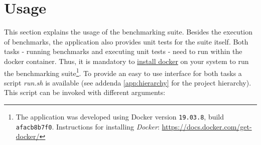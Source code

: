 \section{Usage}\label{sec:benchmarks_usage}
This section explains the usage of the benchmarking suite. Besides the execution of benchmarks, the application also provides unit tests for the suite itself. Both tasks - running benchmarks and executing unit tests - need to run within the docker container. Thus, it is mandatory to \href{https://docs.docker.com/get-docker/}{install docker} on your system to run the benchmarking suite\footnote{The application was developed using Docker version \texttt{19.03.8}, build \texttt{afacb8b7f0}. Instructions for installing \textit{Docker}: \url{https://docs.docker.com/get-docker/}}. To provide an easy to use interface for both tasks a script \textit{run.sh} is available (see addenda \ref{app:hierarchy} for the project hierarchy). This script can be invoked with different arguments:
